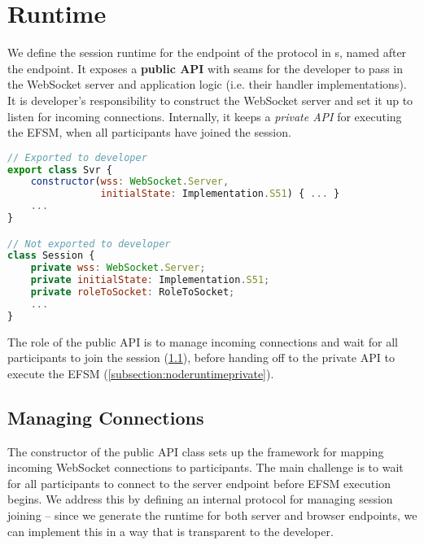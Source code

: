 \section{Runtime}
\label{section:noderuntime}

We define the session runtime for the  endpoint
of the  protocol in s,
named after the endpoint.
It exposes a \textbf{public API}
with seams for the developer to pass in the WebSocket server 
and application logic
(i.e. their handler implementations).
It is developer's responsibility to construct the
WebSocket server and set it up to listen for incoming connections.
Internally, it keeps a \textit{private API}
for executing the EFSM, when all participants have 
joined the session.

\begin{lstlisting}[language=javascript]
// Exported to developer
export class Svr {
	constructor(wss: WebSocket.Server,
				initialState: Implementation.S51) { ... }
	...
}

// Not exported to developer
class Session {
	private wss: WebSocket.Server;
	private initialState: Implementation.S51;
	private roleToSocket: RoleToSocket;
	...
}
\end{lstlisting}

The role of the public API is to manage incoming connections and
wait for all participants to join the session 
(\cref{subsection:noderuntimepublic}), before
handing off to the private API to execute the EFSM
(\cref{subsection:noderuntimeprivate}).

\subsection{Managing Connections}
\label{subsection:noderuntimepublic}

The constructor of the public API class sets up
the framework for mapping incoming WebSocket connections to
participants. 
The main challenge is to wait for all participants to 
connect to the server endpoint before EFSM execution begins.
We address this by defining an internal protocol for managing
session joining -- since we generate the runtime for both server 
and browser endpoints, we can implement this in a way that is 
transparent to the developer.

